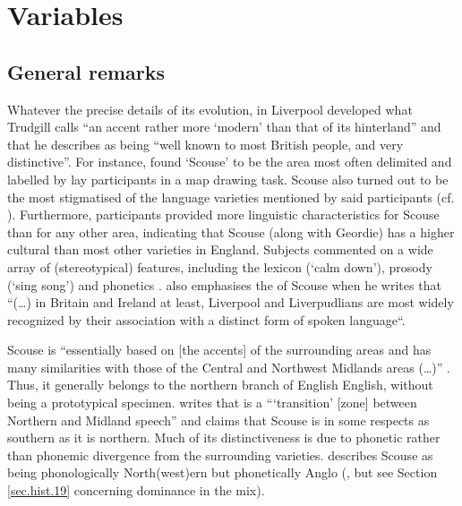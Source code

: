 \chapter{Variables}
\label{ch.var}

	\section{General remarks}\label{sec.var.general}

Whatever the precise details of its evolution, in Liverpool developed what Trudgill calls ``an accent rather more `modern' than that of its hinterland'' \citep[70]{trudgill1999} and that he describes as being ``well known to most British people, and very distinctive''.
For instance, \textcite{montgomery2007} found `Scouse' to be the  area most often delimited and labelled by lay participants in a map drawing task.
Scouse also turned out to be the most stigmatised of the language varieties mentioned by said participants (cf. \cite[194 and 254]{montgomery2007}).
Furthermore, participants provided more linguistic characteristics for Scouse than for any other  area, indicating that Scouse (along with Geordie) has a higher cultural  than most other varieties in England.
Subjects commented on a wide array of (stereotypical) features, including the lexicon (`calm down'), prosody (`sing song') and phonetics \citep[cf.][180--181]{montgomery2007a}.
\textcite[15]{crowley2012} also emphasises the  of Scouse when he writes that ``(\dots) in Britain and Ireland at least, Liverpool and Liverpudlians are most widely recognized by their association with a distinct form of spoken language``.

Scouse is ``essentially based on [the accents] of the surrounding areas and has many similarities with those of the Central  and Northwest Midlands areas (\dots)'' \citep[70]{trudgill1999}.
Thus, it generally belongs to the northern branch of English English, without being a prototypical specimen.
\citet[18]{wales2006} writes that  is a ```transition' [zone] between Northern and Midland  speech'' and \citet[72]{trudgill1999} claims that Scouse is in some respects as southern as it is northern.
Much of its distinctiveness is due to phonetic rather than phonemic divergence from the surrounding varieties. \textcite{knowles1973} describes Scouse as being phonologically North(west)ern but phonetically Anglo  (\citealt[cf. also][80]{knowles1978}, but see Section \ref{sec.hist.19} concerning  dominance in the  mix).

